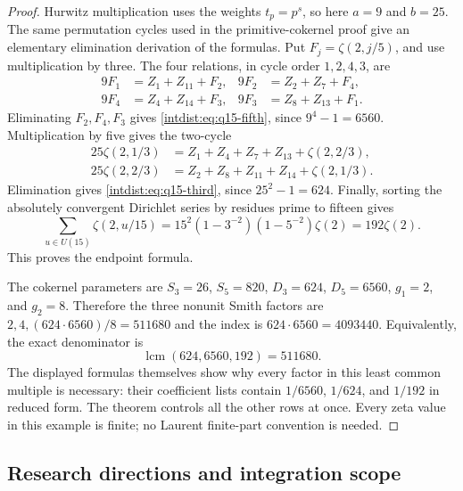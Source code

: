 \begin{proof}
Hurwitz multiplication uses the weights $t_p=p^s$, so here $a=9$ and
$b=25$. The same permutation cycles used in the primitive-cokernel
proof give an elementary elimination derivation of the formulas.
Put $F_j=\zeta(2,j/5)$, and use multiplication by three. The four
relations, in cycle order $1,2,4,3$, are
\[
\begin{aligned}
9F_1&=Z_1+Z_{11}+F_2,&
9F_2&=Z_2+Z_7+F_4,\\
9F_4&=Z_4+Z_{14}+F_3,&
9F_3&=Z_8+Z_{13}+F_1.
\end{aligned}
\]
Eliminating $F_2,F_4,F_3$ gives
\eqref{intdist:eq:q15-fifth}, since $9^4-1=6560$.
Multiplication by five gives the two-cycle
\[
\begin{aligned}
25\zeta(2,1/3)&=Z_1+Z_4+Z_7+Z_{13}+\zeta(2,2/3),\\
25\zeta(2,2/3)&=Z_2+Z_8+Z_{11}+Z_{14}+\zeta(2,1/3).
\end{aligned}
\]
Elimination gives \eqref{intdist:eq:q15-third}, since $25^2-1=624$.
Finally, sorting the absolutely convergent Dirichlet series by
residues prime to fifteen gives
\[
 \sum_{u\in U(15)}\zeta(2,u/15)
 =15^2(1-3^{-2})(1-5^{-2})\zeta(2)=192\zeta(2).
\]
This proves the endpoint formula.

The cokernel parameters are $S_3=26$, $S_5=820$, $D_3=624$,
$D_5=6560$, $g_1=2$, and $g_2=8$. Therefore the three nonunit Smith
factors are $2,4,(624\cdot6560)/8=511680$ and the index is
$624\cdot6560=4093440$. Equivalently, the exact denominator is
\[
 \operatorname{lcm}(624,6560,192)=511680.
\]
The displayed formulas themselves show why every factor in this least
common multiple is necessary: their coefficient lists contain
$1/6560$, $1/624$, and $1/192$ in reduced form. The theorem controls
all the other rows at once. Every zeta value in this example is
finite; no Laurent finite-part convention is needed.
\end{proof}

\subsection{Research directions and integration scope}

